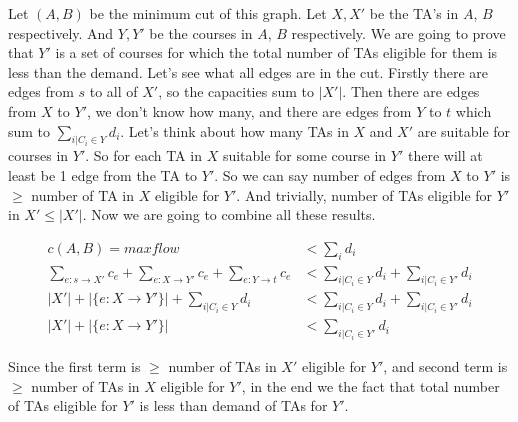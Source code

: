 \documentclass[12pt]{report}
\begin{document}
\begin{enumerate}[label=\textbf{\arabic*.}]
  Let $(A, B)$ be the minimum cut of this graph. Let $X, X'$ be the TA's in $A$, $B$ respectively. And $Y, Y'$ be the courses in $A$, $B$ 
  respectively. We are going to prove that $Y'$ is a set of courses for which the total number of TAs eligible for them is less than the demand.
  Let's see what all edges are in the cut. Firstly there are edges from $s$ to all of $X'$, so the capacities sum to $|X'|$. Then there are edges
  from $X$ to $Y'$, we don't know how many, and there are edges from $Y$ to $t$ which sum to $\sum_{i|C_i \in Y} d_i$. Let's think about how many TAs
  in $X$ and $X'$ are suitable for courses in $Y'$. So for each TA in $X$ suitable for some course in $Y'$ there will at least be 1 edge from the TA 
  to $Y'$. So we can say number of edges from $X$ to $Y'$ is $\geq$ number of TA in $X$ eligible for $Y'$. And trivially, number of TAs eligible for
  $Y'$ in $X' \leq |X'|$. 
  Now we are going to combine all these results.
  
  \begin{align*}
    c(A,B) = maxflow &< \sum_i d_i \\
    \sum_{e:s \rightarrow X'} c_e + \sum_{e:X \rightarrow Y'} c_e + \sum_{e:Y \rightarrow t} c_e &< \sum_{i|C_i \in Y} d_i + \sum_{i|C_i \in Y'} d_i \\
    |X'| + |\{e:X \rightarrow Y'\}| + \sum_{i|C_i \in Y} d_i &< \sum_{i|C_i \in Y} d_i + \sum_{i|C_i \in Y'} d_i \\
    |X'| + |\{e:X \rightarrow Y'\}| &< \sum_{i|C_i \in Y'} d_i
  \end{align*}

  Since the first term is $\geq$ number of TAs in $X'$ eligible for $Y'$, and second term is $\geq$ number of TAs in $X$ eligible for $Y'$, in the end
  we the fact that total number of TAs eligible for $Y'$ is less than demand of TAs for $Y'$.


\end{enumerate}
\end{document}
